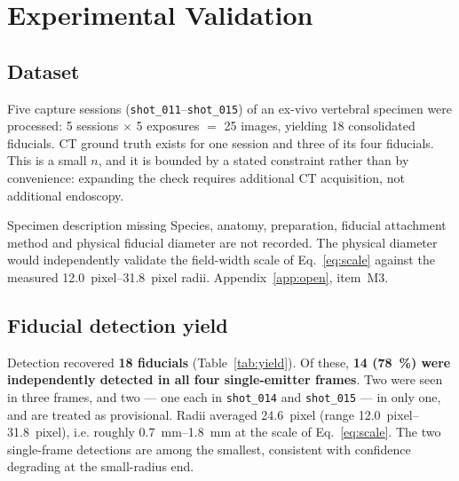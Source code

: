 \documentclass[journal,10pt]{IEEEtran}
\begin{document}
\section{Experimental Validation}\label{sec:results}

\subsection{Dataset}
Five capture sessions (\texttt{shot\_011}--\texttt{shot\_015}) of an ex-vivo
vertebral specimen were processed: 5 sessions $\times$ 5 exposures $=$ 25 images,
yielding 18 consolidated fiducials. CT ground truth exists for one session and
three of its four fiducials. This is a small $n$, and it is bounded by a stated
constraint rather than by convenience: expanding the check requires additional CT
acquisition, not additional endoscopy.

\begin{todobox}{Specimen description missing}
Species, anatomy, preparation, fiducial attachment method and physical fiducial
diameter are not recorded. The physical diameter would independently validate the
field-width scale of Eq.~\eqref{eq:scale} against the measured
\SIrange{12.0}{31.8}{pixel} radii. Appendix~\ref{app:open}, item~M3.
\end{todobox}

\subsection{Fiducial detection yield}
Detection recovered \textbf{18 fiducials} (Table~\ref{tab:yield}). Of these,
\textbf{14 (\SI{78}{\percent}) were independently detected in all four
single-emitter frames}. Two were seen in three frames, and two --- one each in
\texttt{shot\_014} and \texttt{shot\_015} --- in only one, and are treated as
provisional. Radii averaged \SI{24.6}{pixel} (range
\SIrange{12.0}{31.8}{pixel}), i.e. roughly \SIrange{0.7}{1.8}{\milli\metre} at
the scale of Eq.~\eqref{eq:scale}. The two single-frame detections are among the
smallest, consistent with confidence degrading at the small-radius end.
\end{document}
